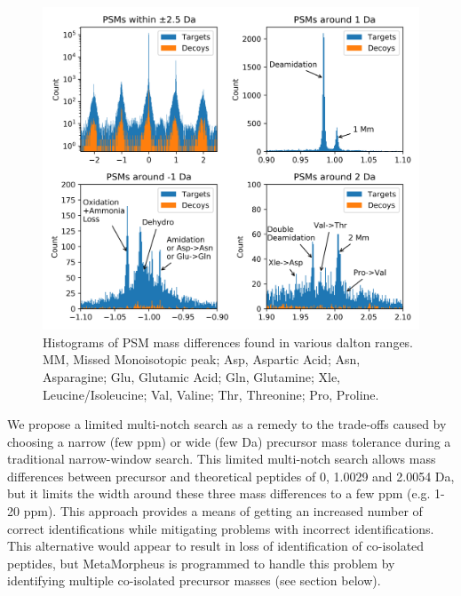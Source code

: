 \documentclass[journal=jprobs,manuscript=article]{achemso}
\begin{document}
\begin{figure}[H]
\includegraphics{fig4jurkat-1012.png}
\caption{Histograms of PSM mass differences found in various dalton ranges. MM, Missed Monoisotopic peak; Asp, Aspartic Acid; Asn, Asparagine; Glu, Glutamic Acid; Gln, Glutamine; Xle, Leucine/Isoleucine; Val, Valine; Thr, Threonine; Pro, Proline.}
\label{fig:fig4jurkat-1012}
\end{figure}

We propose a limited multi-notch search as a remedy to the trade-offs caused by choosing a narrow (few ppm) or wide (few Da) precursor mass tolerance during a traditional narrow-window search.
This limited multi-notch search allows mass differences between precursor and theoretical peptides of 0, 1.0029 and 2.0054 Da, but it limits the width around these three mass differences to a few ppm (e.g. 1-20 ppm).
This approach provides a means of getting an increased number of correct identifications while mitigating problems with incorrect identifications.
This alternative would appear to result in loss of identification of co-isolated peptides, but MetaMorpheus is programmed to handle this problem by identifying multiple co-isolated precursor masses (see section below).
\end{document}
